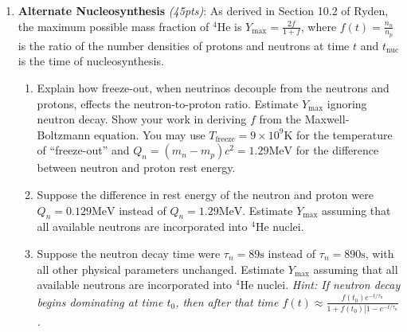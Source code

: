 \documentclass[12pt,preprint]{aastex}
\def\K{\mathrm{K}}
\def\s{\mathrm{s}}
\def\MeV{\mathrm{MeV}}
\newcommand\sn[2]{#1 \times 10^{#2}}
\def\Ymax{Y_{\mathrm{max}}}
\def\He{^4\mathrm{He}}
\def\tnuc{t_{\mathrm{nuc}}}
\begin{document}
\begin{enumerate}
\item \textbf{Alternate Nucleosynthesis} \textit{(45pts)}: 
	As derived in Section 10.2 of Ryden, the maximum possible mass fraction of $\He$ is $\Ymax = \frac{2f}{1+f}$, where $f(t) = \frac{n_n}{n_p}$ is the ratio of the number densities of protons and neutrons at time $t$ and $\tnuc$ is the time of nucleosynthesis.  
	\begin{enumerate}
	\item Explain how freeze-out, when neutrinos decouple from the neutrons and protons, effects the neutron-to-proton ratio. Estimate $\Ymax$ ignoring neutron decay. Show your work in deriving $f$ from the Maxwell-Boltzmann equation. You may use $T_{\mathrm{freeze}} = \sn{9}{9} \K$ for the temperature of ``freeze-out'' and $Q_n = (m_n - m_p)c^2 = 1.29 \MeV$ for the difference between neutron and proton rest energy.
	\item Suppose the difference in rest energy of the neutron and proton were $Q_n = 0.129 \MeV$ instead of $Q_n = 1.29 \MeV$. Estimate $\Ymax$ assuming that all available neutrons are incorporated into $\He$ nuclei. 
	\item Suppose the neutron decay time were $\tau_n = 89 \s$ instead of $\tau_n = 890 \s$, with all other physical parameters unchanged. Estimate $\Ymax$ assuming that all available neutrons are incorporated into $\He$ nuclei. \textit{Hint: If neutron decay begins dominating at time $t_0$, then after that time $f(t) \approx \frac{f(t_0) e^{-t/\tau_n}}{1+f(t_0)[1-e^{-t/\tau_n}}$.}
	\end{enumerate}


\end{enumerate}
\end{document}
